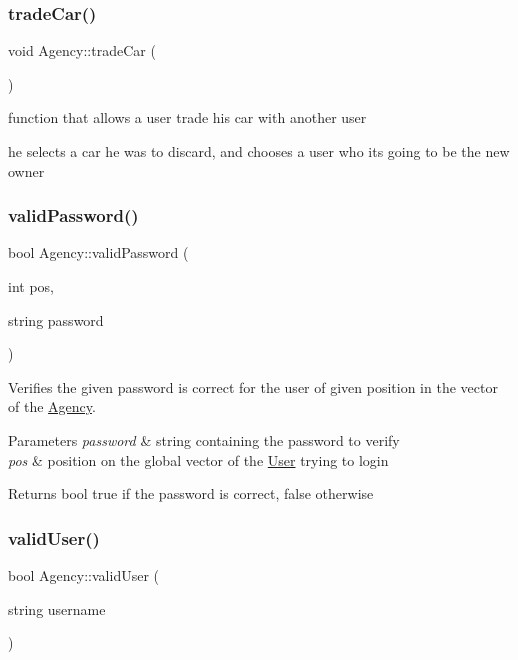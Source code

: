 \subsubsection{\texorpdfstring{trade\+Car()}{tradeCar()}}
{\footnotesize\ttfamily void Agency\+::trade\+Car (\begin{DoxyParamCaption}{ }\end{DoxyParamCaption})}



function that allows a user trade his car with another user 

he selects a car he was to discard, and chooses a user who its going to be the new owner \mbox{\label{class_agency_a12c6a13fdeaaa5a2adab736313b3d180}} 
\subsubsection{\texorpdfstring{valid\+Password()}{validPassword()}}
{\footnotesize\ttfamily bool Agency\+::valid\+Password (\begin{DoxyParamCaption}\item[{int}]{pos,  }\item[{string}]{password }\end{DoxyParamCaption})}



Verifies the given password is correct for the user of given position in the vector of the \hyperlink{class_agency}{Agency}. 


\begin{DoxyParams}{Parameters}
{\em password} & string containing the password to verify \\
\hline
{\em pos} & position on the global vector of the \hyperlink{class_user}{User} trying to login\\
\hline
\end{DoxyParams}
\begin{DoxyReturn}{Returns}
bool true if the password is correct, false otherwise 
\end{DoxyReturn}
\mbox{\label{class_agency_a633274c6bc861317f03bf378e5286312}} 
\subsubsection{\texorpdfstring{valid\+User()}{validUser()}}
{\footnotesize\ttfamily bool Agency\+::valid\+User (\begin{DoxyParamCaption}\item[{string}]{username }\end{DoxyParamCaption})}



